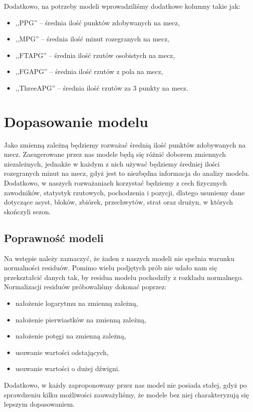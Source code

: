 \documentclass[11pt,a4paper]{article}
\begin{document}
	Dodatkowo, na potrzeby modeli wprowadziliśmy dodatkowe kolumny takie jak:
\begin{itemize}	
	\item ,,PPG'' -- średnia ilość punktów zdobywanych na mecz,
	\item ,,MPG'' -- średnia ilość minut rozegranych na mecz,
	\item ,,FTAPG'' -- średnia ilość rzutów osobistych na mecz,
	\item ,,FGAPG'' -- średnia ilość rzutów z pola na mecz,
	\item ,,ThreeAPG'' -- średnia ilość rzutów za 3 punkty na mecz.
\end{itemize}
	
\section{Dopasowanie modelu}
Jako zmienną zależną będziemy rozważać średnią ilość punktów zdobywanych na mecz. Zasugerowane przez nas modele będą się różnić doborem zmiennych niezależnych, jednakże w każdym z nich używać będziemy średniej ilości rozegranych minut na mecz, gdyż jest to niezbędna informacja do analizy modelu. Dodatkowo, w naszych rozważaniach korzystać będziemy z cech fizycznych zawodników, statystyk rzutowych, pochodzenia i pozycji, dlatego usuniemy dane dotyczące asyst, bloków, zbiórek, przechwytów, strat oraz drużyn, w których skończyli sezon.

\subsection{Poprawność modeli}
Na wstępie należy zaznaczyć, że żaden z naszych modeli nie spełnia warunku normalności residuów. Pomimo wielu podjętych prób nie udało nam się przekształcić danych tak, by residua modelu pochodziły z rozkładu normalnego. Normalizacji residuów próbowaliśmy dokonać poprzez:
\begin{itemize}
	\item nałożenie logarytmu na zmienną zależną,
	\item nałożenie pierwiastków na zmienną zależną,
	\item nałożenie potęgi na zmienną zależną,
	\item usuwanie wartości odstających,
	\item usuwanie wartości o dużej dźwigni.
\end{itemize}
Dodatkowo, w każdy zaproponowany przez nas model nie posiada stałej, gdyż po sprawdzeniu kilku możliwości zauważyliśmy, że modele bez niej charakteryzują się lepszym dopasowaniem.
\end{document}
